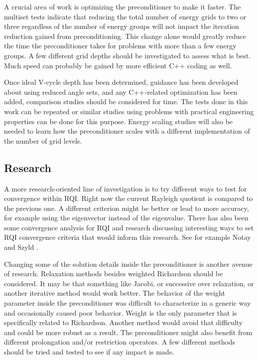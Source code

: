 A crucial area of work is optimizing the preconditioner to make it faster. The multiset tests indicate that reducing the total number of energy grids to two or three regardless of the number of energy groups will not impact the iteration reduction gained from preconditioning. This change alone would greatly reduce the time the preconditioner takes for problems with more than a few energy groups. A few different grid depths should be investigated to assess what is best. Much speed can probably be gained by more efficient C++ coding as well. 

Once ideal V-cycle depth has been determined, guidance has been developed about using reduced angle sets, and any C++-related optimization has been added, comparison studies should be considered for time. The tests done in this work can be repeated or similar studies using problems with practical engineering properties can be done for this purpose. Energy scaling studies will also be needed to learn how the preconditioner scales with a different implementation of the number of grid levels.  

\subsection{Research}
A more research-oriented line of investigation is to try different ways to test for convergence within RQI. Right now the current Rayleigh quotient is compared to the previous one. A different criterion might be better or lead to more accuracy, for example using the eigenvector instead of the eigenvalue. There has also been some convergence analysis for RQI and research discussing interesting ways to set RQI convergence criteria that would inform this research. See for example Notay \cite{Notay2003} and Szyld \cite{Szyld2011}.
    
Changing some of the solution details inside the preconditioner is another avenue of research. Relaxation methods besides weighted Richardson should be considered. It may be that something like Jacobi, or successive over relaxation, or another iterative method would work better. The behavior of the weight parameter inside the preconditioner was difficult to characterize in a generic way and occasionally caused poor behavior. Weight is the only parameter that is specifically related to Richardson. Another method would avoid that difficulty and could be more robust as a result. The preconditioner might also benefit from different prolongation and/or restriction operators. A few different methods should be tried and tested to see if any impact is made. 

